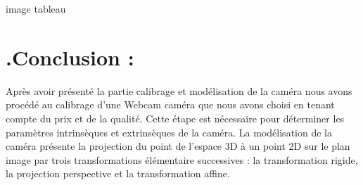  image tableau 
 \section{.Conclusion :}
 Après avoir présenté la partie calibrage et modélisation de la caméra nous avons procédé 
au calibrage d'une Webcam caméra que nous avons choisi en tenant compte du prix et de la 
qualité. Cette étape est nécessaire pour déterminer les paramètres intrinsèques et extrinsèques 
de la caméra. La modélisation de la caméra présente la projection du point de l'espace 3D à un 
point 2D sur le plan image par trois transformations élémentaire successives : la 
transformation rigide, la projection perspective et la transformation affine.
